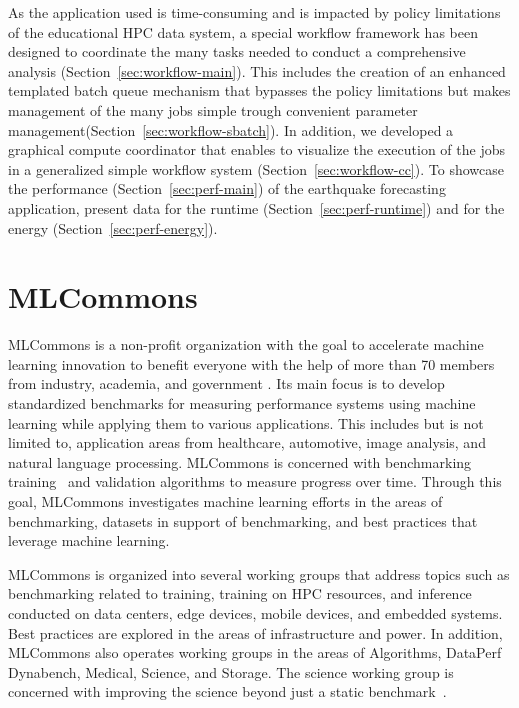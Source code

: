 \documentclass[utf8]{FrontiersinVancouver} %
\begin{document}
As the application used is time-consuming and is impacted by policy
limitations of the educational HPC data system, a special workflow
framework has been designed to coordinate the many tasks needed to
conduct a comprehensive analysis
(Section~\ref{sec:workflow-main}). This includes the creation of an
enhanced templated batch queue mechanism that bypasses the policy
limitations but makes management of the many jobs simple trough
convenient parameter management(Section~\ref{sec:workflow-sbatch}). In
addition, we developed a graphical compute coordinator that enables to
visualize the execution of the jobs in a generalized simple workflow
system (Section~\ref{sec:workflow-cc}).  To showcase the performance
(Section~\ref{sec:perf-main}) of the earthquake forecasting
application, present data for the runtime
(Section~\ref{sec:perf-runtime}) and for the energy
(Section~\ref{sec:perf-energy}).


\section{MLCommons}
\label{sec:mlcommons}

MLCommons is a non-profit organization with the goal to accelerate
machine learning innovation to benefit everyone with the help of more
than 70 members from industry, academia, and government
\citep{www-mlcommons}. Its main focus is to develop standardized
benchmarks for measuring performance systems using machine learning
while applying them to various applications. This includes but is not
limited to, application areas from healthcare, automotive, image
analysis, and natural language processing. MLCommons is concerned with
benchmarking training~\citep{mlperf-training} and validation
algorithms to measure progress over time. Through this goal, MLCommons
investigates machine learning efforts in the areas of benchmarking,
datasets in support of benchmarking, and best practices that leverage
machine learning.

MLCommons is organized into several working groups that address topics
such as benchmarking related to training, training on HPC resources,
and inference conducted on data centers, edge devices, mobile devices,
and embedded systems. Best practices are explored in the areas of
infrastructure and power. In addition, MLCommons also operates working
groups in the areas of Algorithms, DataPerf Dynabench, Medical,
Science, and Storage. The science working group is concerned with
improving the science beyond just a static
benchmark~\citep{las-22-mlcommons-science}.
\end{document}
